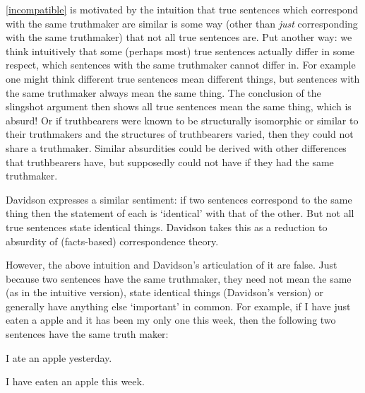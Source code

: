 \ref{incompatible} is motivated by the intuition that true sentences which correspond with the same truthmaker are similar is some way (other than \emph{just} corresponding with the same truthmaker) that not all true sentences are.
Put another way: we think intuitively that some (perhaps most) true sentences actually differ in some respect, which sentences with the same truthmaker cannot differ in.
For example one might think different true sentences mean different things, but sentences with the same truthmaker always mean the same thing.
The conclusion of the slingshot argument then shows all true sentences mean the same thing, which is absurd!
Or if truthbearers were known to be structurally isomorphic or similar to their truthmakers and the structures of truthbearers varied, then they could not share a truthmaker.
Similar absurdities could be derived with other differences that truthbearers have, but supposedly could not have if they had the same truthmaker.

Davidson expresses a similar sentiment: if two sentences correspond to the same thing then the statement of each is `identical' with that of the other.
But not all true sentences state identical things.
Davidson takes this as a reduction to absurdity of (facts-based) correspondence theory.
\parencite[750]{Davidson_1969}

However, the above intuition and Davidson's articulation of it are false.
Just because two sentences have the same truthmaker, they need not mean the same (as in the intuitive version), state identical things (Davidson's version) or generally have anything else `important' in common.
For example, if I have just eaten a apple and it has been my only one this week, then the following two sentences have the same truth maker:

	\begin{example} \label{yesterday}
	I ate an apple yesterday.
	\end{example}

	\begin{example} \label{week}
	I have eaten an apple this week.
	\end{example}

